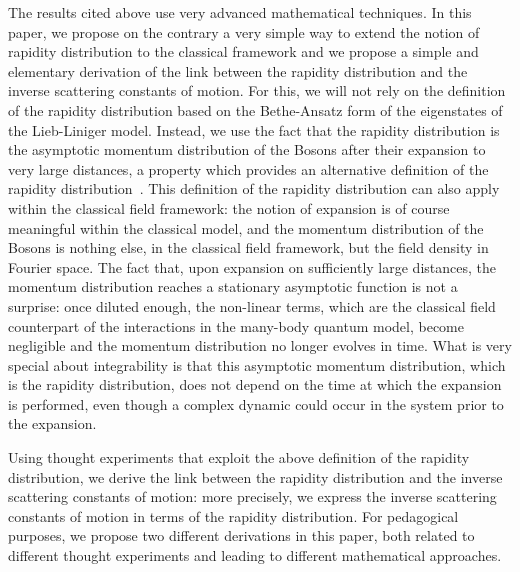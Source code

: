 \documentclass[submission,Phys,10pt]{SciPost}%
\begin{document}
The results cited above use very advanced mathematical techniques.
In this paper, we propose on the contrary
a very simple way to extend the notion of rapidity distribution
 to the classical framework and
 we propose a simple and elementary derivation of the link between the rapidity distribution
 and the inverse scattering  constants of motion.
 For this, we will not rely on the  definition of
 the rapidity distribution
 based on the Bethe-Ansatz form of the eigenstates of the Lieb-Liniger model.
 Instead, we use the
 fact that the rapidity distribution is the asymptotic
 momentum distribution of the Bosons after their  expansion
 to very large distances, a property which provides an alternative definition
 of the rapidity distribution~\cite{bouchoule_generalized_2022}.
 This definition of the rapidity distribution
 can also apply within the classical field framework:
 the notion of expansion is of course meaningful within the classical model,
 and the momentum distribution of the Bosons is nothing else, in the classical
 field framework, but
 the field density in Fourier space.
 The fact that, upon expansion on sufficiently large distances, the momentum distribution
 reaches a stationary asymptotic function is not a surprise: once diluted enough, the
 non-linear terms, which are the classical field counterpart of the interactions
 in the many-body quantum model,  become negligible and the momentum
 distribution no longer evolves in time.
 What is very special about integrability 
 is that this asymptotic momentum distribution, which is %
 the rapidity distribution,
 does not depend on the  time at which the
 expansion is performed, even though
 a complex dynamic could occur in the system prior
 to the expansion.


 Using thought experiments that exploit the above definition
 of the rapidity distribution, we 
derive  the link between the rapidity distribution
and  the inverse scattering  constants of motion: more precisely,
we express the inverse scattering constants of motion  in terms
of the rapidity distribution. 
For pedagogical purposes, we propose  two different derivations in this paper,
both related to different thought experiments and leading to different
mathematical approaches.


  
\end{document}
